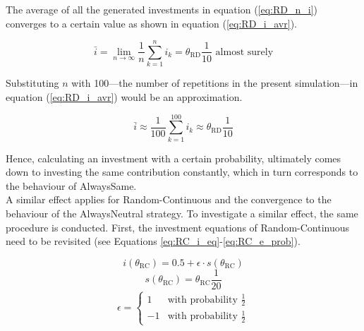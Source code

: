 \documentclass[11pt]{article}
\begin{document}
	\noindent
	The average of all the generated investments in equation (\ref{eq:RD_n_i}) converges to a certain value as shown in equation (\ref{eq:RD_i_avr}).

	\begin{equation}
		\bar i = \lim_{n\to\infty} \frac{1}{n} \sum_{k=1}^{n} i_k = \theta_{\mathrm{RD}} \frac{1}{10} \text{ almost surely}
	\label{eq:RD_i_avr}
	\end{equation}

	\noindent
	Substituting $n$ with 100---the number of repetitions in the present simulation---in equation (\ref{eq:RD_i_avr}) would be an approximation.

	\begin{equation}
		\bar i \approx \frac{1}{100} \sum_{k=1}^{100} i_k \approx \theta_{\mathrm{RD}} \frac{1}{10}
		\label{eq:RD_approx_i}
	\end{equation}

	\noindent
	Hence, calculating an investment with a certain probability, ultimately comes down to investing the same contribution constantly, which in turn corresponds to the behaviour of AlwaysSame.\\

	\noindent
	A similar effect applies for Random-Continuous and the convergence to the behaviour of the AlwaysNeutral strategy.
	To investigate a similar effect, the same procedure is conducted.
	First, the investment equations of Random-Continuous need to be revisited (see Equations \ref{eq:RC_i_eq}-\ref{eq:RC_e_prob}).

	\begin{equation}
		i(\theta_{\mathrm{RC}}) = 0.5 + \epsilon \cdot s(\theta_{\mathrm{RC}})
		\label{eq:}
	\end{equation}
	\begin{equation}
		s(\theta_{\mathrm{RC}}) = \theta_{\mathrm{RC}} \frac{1}{20}
		\label{eq:}
	\end{equation}
	\begin{equation}
		\begin{split}
		\epsilon = 
		\begin{cases}
		  1 & \text{with probability } \frac{1}{2}\\
		 -1 & \text{with probability } \frac{1}{2} 
		\end{cases}
		\label{eq:prob_eps}
		\end{split}
	\end{equation}
\end{document}
